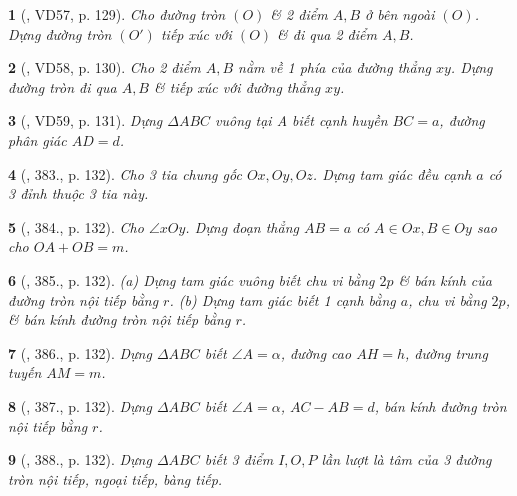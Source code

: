 \documentclass{article}
\newtheorem{baitoan}{}
\begin{document}
\begin{baitoan}[\cite{Binh_Toan_9_tap_2}, VD57, p. 129]
	Cho đường tròn $(O)$ \& 2 điểm $A,B$ ở bên ngoài $(O)$. Dựng đường tròn $(O')$ tiếp xúc với $(O)$ \& đi qua 2 điểm $A,B$.
\end{baitoan}

\begin{baitoan}[\cite{Binh_Toan_9_tap_2}, VD58, p. 130]
	Cho 2 điểm $A,B$ nằm về 1 phía của đường thẳng $xy$. Dựng đường tròn đi qua $A,B$ \& tiếp xúc với đường thẳng $xy$.
\end{baitoan}
\begin{baitoan}[\cite{Binh_Toan_9_tap_2}, VD59, p. 131]
	Dựng $\Delta ABC$ vuông tại A biết cạnh huyền $BC = a$, đường phân giác $AD = d$.
\end{baitoan}

\begin{baitoan}[\cite{Binh_Toan_9_tap_2}, 383., p. 132]
	Cho 3 tia chung gốc $Ox,Oy,Oz$. Dựng tam giác đều cạnh $a$ có 3 đỉnh thuộc 3 tia này.
\end{baitoan}

\begin{baitoan}[\cite{Binh_Toan_9_tap_2}, 384., p. 132]
	Cho $\angle{xOy}$. Dựng đoạn thẳng $AB = a$ có $A\in Ox,B\in Oy$ sao cho $OA + OB = m$.
\end{baitoan}

\begin{baitoan}[\cite{Binh_Toan_9_tap_2}, 385., p. 132]
	(a) Dựng tam giác vuông biết chu vi bằng $2p$ \& bán kính của đường tròn nội tiếp bằng $r$. (b) Dựng tam giác biết 1 cạnh bằng $a$, chu vi bằng $2p$, \& bán kính đường tròn nội tiếp bằng $r$.
\end{baitoan}

\begin{baitoan}[\cite{Binh_Toan_9_tap_2}, 386., p. 132]
	Dựng $\Delta ABC$ biết $\angle{A} = \alpha$, đường cao $AH = h$, đường trung tuyến $AM = m$.
\end{baitoan}

\begin{baitoan}[\cite{Binh_Toan_9_tap_2}, 387., p. 132]
	Dựng $\Delta ABC$ biết $\angle{A} = \alpha$, $AC - AB = d$, bán kính đường tròn nội tiếp bằng $r$.
\end{baitoan}

\begin{baitoan}[\cite{Binh_Toan_9_tap_2}, 388., p. 132]
	Dựng $\Delta ABC$ biết 3 điểm $I,O,P$ lần lượt là tâm của 3 đường tròn nội tiếp, ngoại tiếp, bàng tiếp.
\end{baitoan}
\end{document}
